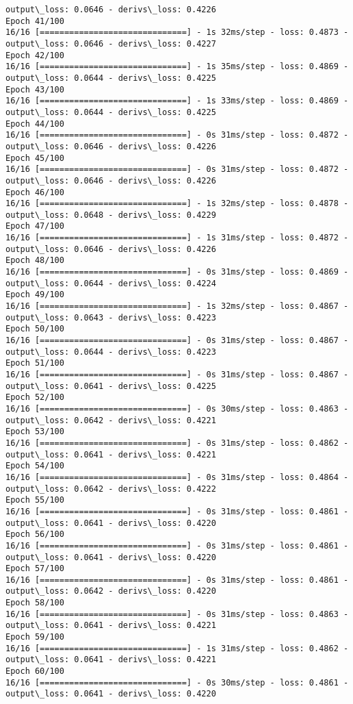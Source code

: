 \documentclass[11pt]{article}
\begin{document}
\begin{Verbatim}[commandchars=\\\{\}]
output\_loss: 0.0646 - derivs\_loss: 0.4226
Epoch 41/100
16/16 [==============================] - 1s 32ms/step - loss: 0.4873 -
output\_loss: 0.0646 - derivs\_loss: 0.4227
Epoch 42/100
16/16 [==============================] - 1s 35ms/step - loss: 0.4869 -
output\_loss: 0.0644 - derivs\_loss: 0.4225
Epoch 43/100
16/16 [==============================] - 1s 33ms/step - loss: 0.4869 -
output\_loss: 0.0644 - derivs\_loss: 0.4225
Epoch 44/100
16/16 [==============================] - 0s 31ms/step - loss: 0.4872 -
output\_loss: 0.0646 - derivs\_loss: 0.4226
Epoch 45/100
16/16 [==============================] - 0s 31ms/step - loss: 0.4872 -
output\_loss: 0.0646 - derivs\_loss: 0.4226
Epoch 46/100
16/16 [==============================] - 1s 32ms/step - loss: 0.4878 -
output\_loss: 0.0648 - derivs\_loss: 0.4229
Epoch 47/100
16/16 [==============================] - 1s 31ms/step - loss: 0.4872 -
output\_loss: 0.0646 - derivs\_loss: 0.4226
Epoch 48/100
16/16 [==============================] - 0s 31ms/step - loss: 0.4869 -
output\_loss: 0.0644 - derivs\_loss: 0.4224
Epoch 49/100
16/16 [==============================] - 1s 32ms/step - loss: 0.4867 -
output\_loss: 0.0643 - derivs\_loss: 0.4223
Epoch 50/100
16/16 [==============================] - 0s 31ms/step - loss: 0.4867 -
output\_loss: 0.0644 - derivs\_loss: 0.4223
Epoch 51/100
16/16 [==============================] - 0s 31ms/step - loss: 0.4867 -
output\_loss: 0.0641 - derivs\_loss: 0.4225
Epoch 52/100
16/16 [==============================] - 0s 30ms/step - loss: 0.4863 -
output\_loss: 0.0642 - derivs\_loss: 0.4221
Epoch 53/100
16/16 [==============================] - 0s 31ms/step - loss: 0.4862 -
output\_loss: 0.0641 - derivs\_loss: 0.4221
Epoch 54/100
16/16 [==============================] - 0s 31ms/step - loss: 0.4864 -
output\_loss: 0.0642 - derivs\_loss: 0.4222
Epoch 55/100
16/16 [==============================] - 0s 31ms/step - loss: 0.4861 -
output\_loss: 0.0641 - derivs\_loss: 0.4220
Epoch 56/100
16/16 [==============================] - 0s 31ms/step - loss: 0.4861 -
output\_loss: 0.0641 - derivs\_loss: 0.4220
Epoch 57/100
16/16 [==============================] - 0s 31ms/step - loss: 0.4861 -
output\_loss: 0.0642 - derivs\_loss: 0.4220
Epoch 58/100
16/16 [==============================] - 0s 31ms/step - loss: 0.4863 -
output\_loss: 0.0641 - derivs\_loss: 0.4221
Epoch 59/100
16/16 [==============================] - 1s 31ms/step - loss: 0.4862 -
output\_loss: 0.0641 - derivs\_loss: 0.4221
Epoch 60/100
16/16 [==============================] - 0s 30ms/step - loss: 0.4861 -
output\_loss: 0.0641 - derivs\_loss: 0.4220

\end{Verbatim}
\end{document}
